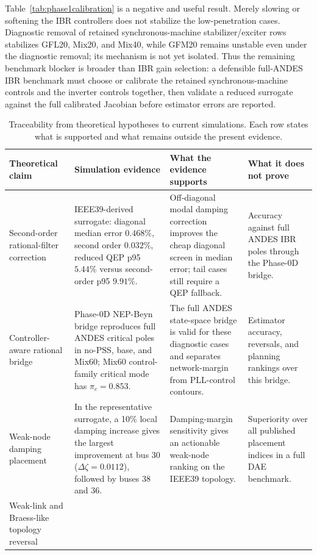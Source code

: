 \documentclass[journal]{IEEEtran}
\begin{document}
Table~\ref{tab:phase1calibration} is a negative and useful result. Merely slowing or softening the IBR controllers does not stabilize the low-penetration cases. Diagnostic removal of retained synchronous-machine stabilizer/exciter rows stabilizes GFL20, Mix20, and Mix40, while GFM20 remains unstable even under the diagnostic removal; its mechanism is not yet isolated. Thus the remaining benchmark blocker is broader than IBR gain selection: a defensible full-ANDES IBR benchmark must choose or calibrate the retained synchronous-machine controls and the inverter controls together, then validate a reduced surrogate against the full calibrated Jacobian before estimator errors are reported.

\begin{table}[t]
\centering
\caption{Traceability from theoretical hypotheses to current simulations. Each row states what is supported and what remains outside the present evidence.}
\label{tab:simulationtrace}
\scriptsize
\setlength{\tabcolsep}{2.5pt}
\begin{tabular}{@{}p{}p{}p{}p{}@{}}
\toprule
Theoretical claim & Simulation evidence & What the evidence supports & What it does not prove\\
\midrule
Second-order rational-filter correction
& IEEE39-derived surrogate: diagonal median error $0.468\%$, second order $0.032\%$, reduced QEP p95 $5.44\%$ versus second-order p95 $9.91\%$.
& Off-diagonal modal damping correction improves the cheap diagonal screen in median error; tail cases still require a QEP fallback.
& Accuracy against full ANDES IBR poles through the Phase-0D bridge.\\
Controller-aware rational bridge
& Phase-0D NEP-Beyn bridge reproduces full ANDES critical poles in no-PSS, base, and Mix60; Mix60 control-family critical mode has $\pi_c=0.853$.
& The full ANDES state-space bridge is valid for these diagnostic cases and separates network-margin from PLL-control contours.
& Estimator accuracy, reversals, and planning rankings over this bridge.\\
Weak-node damping placement
& In the representative surrogate, a 10\% local damping increase gives the largest improvement at bus 30 ($\Delta\zeta=0.0112$), followed by buses 38 and 36.
& Damping-margin sensitivity gives an actionable weak-node ranking on the IEEE39 topology.
& Superiority over all published placement indices in a full DAE benchmark.\\
Weak-link and Braess-like topology reversal

\end{tabular}
\end{table}
\end{document}

